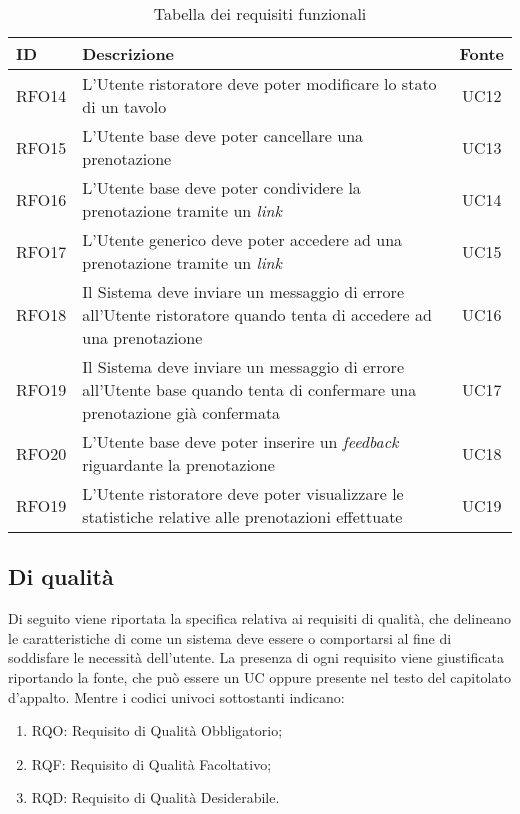 \begin{table}[H]
	\renewcommand{\arraystretch}{1.5}
	\centering
	\begin{tabularx}{\textwidth}{l|X|c}
		\textbf{ID} & \textbf{Descrizione}                                                                                                      & \textbf{Fonte} \\
		\hline
		RFO14       & L'Utente ristoratore deve poter modificare lo stato di un tavolo                                                          & UC12           \\
		\hline
		RFO15       & L'Utente base deve poter cancellare una prenotazione                                                                      & UC13           \\
		\hline
		RFO16       & L'Utente base deve poter condividere la prenotazione tramite un \textit{link}                                                     & UC14           \\
		\hline
		RFO17       & L'Utente generico deve poter accedere ad una prenotazione tramite un \textit{link}                                                 & UC15           \\
		\hline
		RFO18       & Il Sistema deve inviare un messaggio di errore all'Utente ristoratore quando tenta di accedere ad una prenotazione        & UC16           \\
		\hline
		RFO19       & Il Sistema deve inviare un messaggio di errore all'Utente base quando tenta di confermare una prenotazione già confermata & UC17           \\
		\hline
		RFO20       & L'Utente base deve poter inserire un \textit{feedback} riguardante la prenotazione                                                 & UC18           \\
		\hline
		RFO19       & L'Utente ristoratore deve poter visualizzare le statistiche relative alle prenotazioni effettuate                         & UC19           \\
		\hline
\end{tabularx}
\caption{Tabella dei requisiti funzionali}
\end{table}

\subsection{Di qualità}

Di seguito viene riportata la specifica relativa ai requisiti di qualità, che delineano le caratteristiche di come un sistema 
deve essere o comportarsi al fine di soddisfare le necessità dell'utente.
La presenza di ogni requisito viene giustificata riportando la fonte, che può essere un UC oppure presente 
nel testo del capitolato d'appalto. Mentre i codici univoci sottostanti indicano:
\begin{enumerate}
	\item RQO: Requisito di Qualità Obbligatorio;
	\item RQF: Requisito di Qualità Facoltativo;
	\item RQD: Requisito di Qualità Desiderabile.
\end{enumerate}

